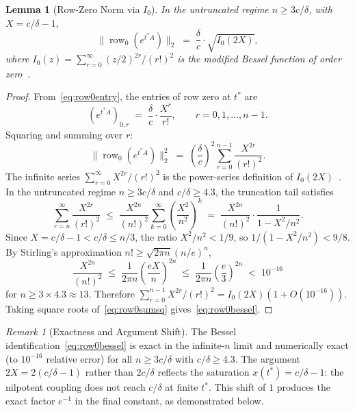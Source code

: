 \documentclass[11pt,reqno]{article}
\theoremstyle{plain}
\newtheorem{lemma}[theorem]{Lemma}
\theoremstyle{definition}
\theoremstyle{remark}
\newtheorem{remark}[theorem]{Remark}
\numberwithin{equation}{section}
\begin{document}
\begin{lemma}[Row-Zero Norm via $I_0$]\label{lem:bessel}
In the untruncated regime $n \ge 3c/\delta$, with $X = c/\delta - 1$,
\begin{equation}\label{eq:row0bessel}
  \bigl\|\operatorname{row}_0\left(e^{t^*A}\right)\bigr\|_2 \;=\; \frac{\delta}{c} \cdot \sqrt{I_0(2X)},
\end{equation}
where $I_0(z) = \sum_{r=0}^\infty (z/2)^{2r}/(r!)^2$ is the modified Bessel function of order zero~\cite[10.25.2]{DLMF}.
\end{lemma}

\begin{proof}
From~\eqref{eq:row0entry}, the entries of row zero at $t^*$ are
\begin{equation}\label{eq:row0entries}
  \left(e^{t^*A}\right)_{0,r} \;=\; \frac{\delta}{c} \cdot \frac{X^r}{r!}, \qquad r = 0, 1, \dots, n-1.
\end{equation}
Squaring and summing over $r$:
\begin{equation}\label{eq:row0sumsq}
  \bigl\|\operatorname{row}_0\left(e^{t^*A}\right)\bigr\|_2^2 \;=\; \left(\frac{\delta}{c}\right)^2 \sum_{r=0}^{n-1} \frac{X^{2r}}{(r!)^2}.
\end{equation}
The infinite series $\sum_{r=0}^\infty X^{2r}/(r!)^2$ is the power-series definition of $I_0(2X)$~\cite[10.25.2]{DLMF}. In the untruncated regime $n \ge 3c/\delta$ and $c/\delta \ge 4.3$, the truncation tail satisfies
\begin{equation}\label{eq:besseltail}
  \sum_{r=n}^\infty \frac{X^{2r}}{(r!)^2} \;\le\; \frac{X^{2n}}{(n!)^2} \sum_{k=0}^\infty \left(\frac{X^2}{n^2}\right)^k \;=\; \frac{X^{2n}}{(n!)^2} \cdot \frac{1}{1 - X^2/n^2}.
\end{equation}
Since $X = c/\delta - 1 < c/\delta \le n/3$, the ratio $X^2/n^2 < 1/9$, so $1/(1 - X^2/n^2) < 9/8$. By Stirling's approximation $n! \ge \sqrt{2\pi n}(n/e)^n$,
\[
  \frac{X^{2n}}{(n!)^2} \;\le\; \frac{1}{2\pi n} \left(\frac{e X}{n}\right)^{2n} \;\le\; \frac{1}{2\pi n} \left(\frac{e}{3}\right)^{2n} \;<\; 10^{-16}
\]
for $n \ge 3 \times 4.3 \approx 13$. Therefore $\sum_{r=0}^{n-1} X^{2r}/(r!)^2 = I_0(2X)(1 + O(10^{-16}))$. Taking square roots of~\eqref{eq:row0sumsq} gives~\eqref{eq:row0bessel}.
\end{proof}

\begin{remark}[Exactness and Argument Shift]\label{rem:besselshift}
The Bessel identification~\eqref{eq:row0bessel} is exact in the infinite-$n$ limit and numerically exact (to $10^{-16}$ relative error) for all $n \ge 3c/\delta$ with $c/\delta \ge 4.3$. The argument $2X = 2(c/\delta - 1)$ rather than $2c/\delta$ reflects the saturation $x(t^*) = c/\delta - 1$: the nilpotent coupling does not reach $c/\delta$ at finite $t^*$. This shift of $1$ produces the exact factor $e^{-1}$ in the final constant, as demonstrated below.
\end{remark}
\end{document}
